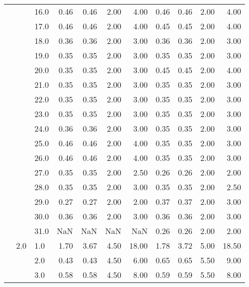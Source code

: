 \begin{tabular}{lllrrrrrrrr}
   &     & 16.0 &       0.46 &      0.46 & 2.00 &   4.00 &       0.46 &      0.46 & 2.00 &   4.00 \\
   &     & 17.0 &       0.46 &      0.46 & 2.00 &   4.00 &       0.45 &      0.45 & 2.00 &   4.00 \\
   &     & 18.0 &       0.36 &      0.36 & 2.00 &   3.00 &       0.36 &      0.36 & 2.00 &   3.00 \\
   &     & 19.0 &       0.35 &      0.35 & 2.00 &   3.00 &       0.35 &      0.35 & 2.00 &   3.00 \\
   &     & 20.0 &       0.35 &      0.35 & 2.00 &   3.00 &       0.45 &      0.45 & 2.00 &   4.00 \\
   &     & 21.0 &       0.35 &      0.35 & 2.00 &   3.00 &       0.35 &      0.35 & 2.00 &   3.00 \\
   &     & 22.0 &       0.35 &      0.35 & 2.00 &   3.00 &       0.35 &      0.35 & 2.00 &   3.00 \\
   &     & 23.0 &       0.35 &      0.35 & 2.00 &   3.00 &       0.35 &      0.35 & 2.00 &   3.00 \\
   &     & 24.0 &       0.36 &      0.36 & 2.00 &   3.00 &       0.35 &      0.35 & 2.00 &   3.00 \\
   &     & 25.0 &       0.46 &      0.46 & 2.00 &   4.00 &       0.35 &      0.35 & 2.00 &   3.00 \\
   &     & 26.0 &       0.46 &      0.46 & 2.00 &   4.00 &       0.35 &      0.35 & 2.00 &   3.00 \\
   &     & 27.0 &       0.35 &      0.35 & 2.00 &   2.50 &       0.26 &      0.26 & 2.00 &   2.00 \\
   &     & 28.0 &       0.35 &      0.35 & 2.00 &   3.00 &       0.35 &      0.35 & 2.00 &   2.50 \\
   &     & 29.0 &       0.27 &      0.27 & 2.00 &   2.00 &       0.37 &      0.37 & 2.00 &   3.00 \\
   &     & 30.0 &       0.36 &      0.36 & 2.00 &   3.00 &       0.36 &      0.36 & 2.00 &   3.00 \\
   &     & 31.0 &        NaN &       NaN &  NaN &    NaN &       0.26 &      0.26 & 2.00 &   2.00 \\
   & 2.0 & 1.0  &       1.70 &      3.67 & 4.50 &  18.00 &       1.78 &      3.72 & 5.00 &  18.50 \\
   &     & 2.0  &       0.43 &      0.43 & 4.50 &   6.00 &       0.65 &      0.65 & 5.50 &   9.00 \\
   &     & 3.0  &       0.58 &      0.58 & 4.50 &   8.00 &       0.59 &      0.59 & 5.50 &   8.00 \\

\end{tabular}
